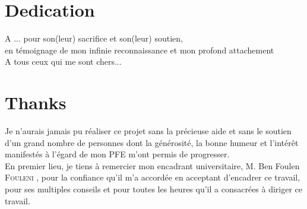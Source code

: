 \documentclass[a4paper, oneside]{report}
\newcommand{\reportAuthor} {%
  FirstName \textsc{LastName}%
}
\newcommand{\juryMemberFour} {%
	M. Ben Foulen \textsc{Fouleni}%
}
\begin{document}



\chapter*{Dedication}
\thispagestyle{empty}
%

\begin{center}
 {\it 
	
A ... pour son(leur) sacrifice et son(leur) soutien, \\
en témoignage de mon infinie reconnaissance et mon profond attachement \\
\vspace{1cm}
A tous ceux qui me sont chers...

}
\end{center}
%
%

\chapter*{Thanks}
\thispagestyle{empty}

Je n'aurais jamais pu réaliser ce projet sans la précieuse aide et sans le soutien d'un grand nombre de personnes dont la générosité, la bonne humeur et l'intérêt manifestés à l'égard de mon PFE m'ont permis de progresser. \\


En premier lieu, je tiens à remercier mon encadrant universitaire, \juryMemberFour{}, pour la confiance qu'il m'a accordée en acceptant d'encadrer ce travail, pour ses multiples conseils et pour toutes les heures qu'il a consacrées à diriger ce travail. \\ 
\end{document}
